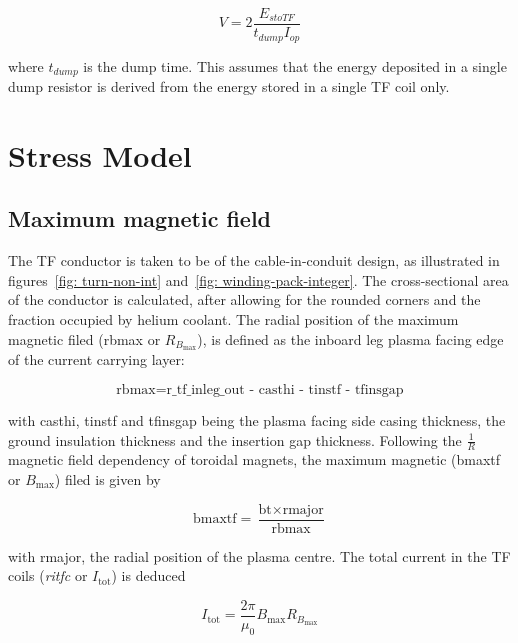\documentclass[hidelinks]{article}
\numberwithin{equation}{section}
\begin{document}
    \begin{equation}\label{eq: dump-voltage}
        V = 2 \frac{E_{stoTF}}{t_{dump}I_{op}}
    \end{equation}

    \noi where $t_{dump}$ is the dump time. This assumes that the energy deposited in 
    a single dump resistor is derived from the energy stored in a single TF coil only.

    \section{Stress Model}

    \subsection{Maximum magnetic field}
    
    \noi The TF conductor is taken to be of the cable-in-conduit design, as 
    illustrated in figures~\ref{fig: turn-non-int} and~\ref{fig: winding-pack-integer}.
    The cross-sectional area of the conductor is calculated, after allowing for the rounded 
    corners and the fraction occupied by helium coolant. The radial position of the maximum 
    magnetic filed (rbmax or $R_{B_\mathrm{max}}$), is defined as the inboard leg plasma facing edge of the current carrying layer: 

    \begin{equation}\label{eq: rbmax}
    \text{rbmax} = \text{r\_tf\_inleg\_out - casthi - tinstf - tfinsgap}
    \end{equation}

    \noi with casthi, tinstf and tfinsgap being the plasma facing side casing thickness, the 
    ground insulation thickness and the insertion gap thickness. Following the $\frac{1}{R}$
    magnetic field dependency of toroidal magnets, the maximum magnetic (bmaxtf or $B_\mathrm{max}$) filed is given by

    \begin{equation}\label{eq: bmaxtf}
        \text{bmaxtf} = \frac{\text{bt}\times\text{rmajor}}{\text{rbmax}}
        \end{equation}

    \noi with rmajor, the radial position of the plasma centre. The total current in the
    TF coils (\emph{ritfc} or $I_\mathrm{tot}$) is deduced 

    \begin{equation}\label{eq: ritfc_latex}
        I_\mathrm{tot} = \frac{2\pi}{\mu_0}B_\mathrm{max}  R_{B_\mathrm{max}} 
    \end{equation}
    
\end{document}
